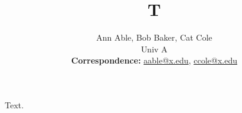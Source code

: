 \documentclass{article}
\title{T}
\author{Ann Able, Bob Baker, Cat Cole \\ Univ A \\ \textbf{Correspondence:} \href{mailto:aable@x.edu}{aable@x.edu}, \href{mailto:ccole@x.edu}{ccole@x.edu}}
\begin{document}
\maketitle
Text.
\end{document}

